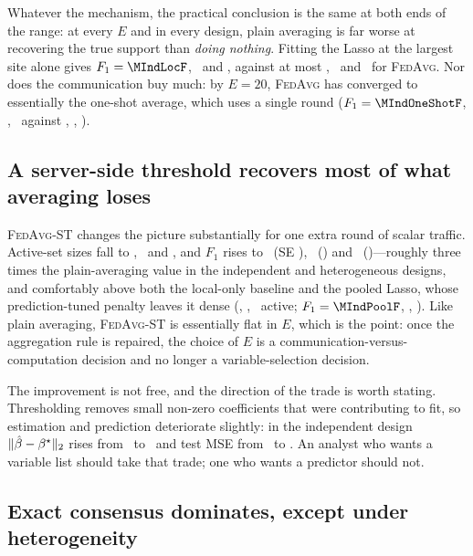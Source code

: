Whatever the mechanism, the practical conclusion is the same at both ends
of the range: at every $E$ and in every design, plain averaging is far worse
at recovering the true support than \emph{doing nothing}. Fitting the Lasso
at the largest site alone gives $F_1 = \MIndLocF$, \MCorLocF\ and
\MHetLocF, against at most \MIndFedFTwenty, \MCorFedFTwenty\ and
\MHetFedFTwenty\ for \textsc{FedAvg}. Nor does the communication buy much:
by $E = 20$, \textsc{FedAvg} has converged to essentially the one-shot
average, which uses a single round
($F_1 = \MIndOneShotF$, \MCorOneShotF, \MHetOneShotF\ against
\MIndFedFTwenty, \MCorFedFTwenty, \MHetFedFTwenty).

\subsection{A server-side threshold recovers most of what averaging loses}

\textsc{FedAvg-ST} changes the picture substantially for one extra round of
scalar traffic. Active-set sizes fall to \MIndStActOne, \MCorStActOne\ and
\MHetStActOne, and $F_1$ rises to \MIndStFOne\ (SE \MIndStSeOne),
\MCorStFOne\ (\MCorStSeOne) and \MHetStFOne\ (\MHetStSeOne)---roughly
three times the plain-averaging value in the independent and heterogeneous
designs, and comfortably above both the local-only baseline and the pooled
Lasso, whose prediction-tuned penalty leaves it dense
(\MIndPoolAct, \MCorPoolAct, \MHetPoolAct\ active; $F_1 = \MIndPoolF$,
\MCorPoolF, \MHetPoolF). Like plain averaging, \textsc{FedAvg-ST} is
essentially flat in $E$, which is the point: once the aggregation rule is
repaired, the choice of $E$ is a communication-versus-computation decision
and no longer a variable-selection decision.

The improvement is not free, and the direction of the trade is worth
stating. Thresholding removes small non-zero coefficients that were
contributing to fit, so estimation and prediction deteriorate slightly:
in the independent design $\|\hat{\beta} - \beta^\star\|_2$ rises from
\MIndFedErrOne\ to \MIndStErrOne\ and test MSE from \MIndFedMseOne\ to
\MIndStMseOne. An analyst who wants a variable list should take that trade;
one who wants a predictor should not.

\subsection{Exact consensus dominates, except under heterogeneity}

